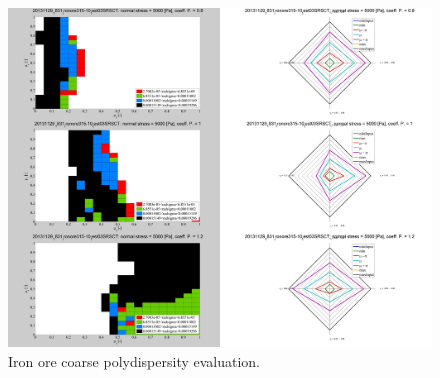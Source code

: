 \begin{figure}[!htb]
\centering
\includegraphics[width=.96\columnwidth]{images/083ironore31510}
\caption[Iron ore coarse polydispersity evaluation]{Iron ore coarse polydispersity
evaluation.}
\label{fig:083ironore31510}
\end{figure}